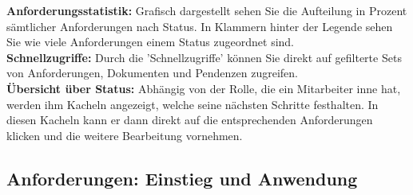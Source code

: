 \textbf{Anforderungsstatistik:}
Grafisch dargestellt sehen Sie die Aufteilung in Prozent sämtlicher Anforderungen nach Status. In Klammern hinter der Legende sehen Sie wie viele Anforderungen einem Status zugeordnet sind. \\

\textbf{Schnellzugriffe:}
Durch die 'Schnellzugriffe' können Sie direkt auf gefilterte Sets von Anforderungen, Dokumenten und Pendenzen zugreifen. \\

\textbf{Übersicht über Status:}
Abhängig von der Rolle, die ein Mitarbeiter inne hat, werden ihm Kacheln angezeigt, welche seine nächsten Schritte festhalten. In diesen Kacheln kann er dann direkt auf die entsprechenden Anforderungen klicken und die weitere Bearbeitung vornehmen.

\pagebreak

\subsection{Anforderungen: Einstieg und Anwendung}


